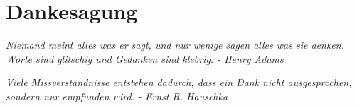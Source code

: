 %
%
\chapter*{Dankesagung}
\thispagestyle{empty}

\begin{displayquote}
\textit{Niemand meint alles was er sagt, und nur wenige sagen alles was sie denken. Worte sind glitschig und Gedanken sind klebrig. - Henry Adams}
\end{displayquote}

\begin{displayquote}
\textit{Viele Missverständnisse entstehen dadurch, dass ein Dank nicht ausgesprochen, sondern nur empfunden wird. - Ernst R. Hauschka}
\end{displayquote}

\lipsum[2-4]

\newpage